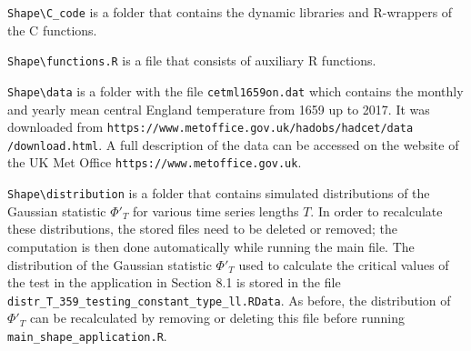 \documentclass[a4paper,12pt]{article}
\begin{document}
\verb|Shape\C_code| \hspace{1pt} is a folder that contains the dynamic libraries and R-wrappers of the C functions.

\verb|Shape\functions.R| \hspace{1pt} is a file that consists of auxiliary R functions.

\verb|Shape\data| \hspace{1pt} is a folder with the file \verb|cetml1659on.dat| which contains the monthly and yearly mean central England temperature from 1659 up to 2017. It was downloaded from \verb|https://www.metoffice.gov.uk/hadobs/hadcet/data| \verb|/download.html|. A full description of the data can be accessed on the website of the UK Met Office \verb|https://www.metoffice.gov.uk|. 

\verb|Shape\distribution| \hspace{1pt} is a folder that  contains simulated distributions of the Gaussian statistic $\Phi'_{T}$ for various time series lengths $T$. In order to recalculate these distributions, the stored files need to be deleted or removed; the computation is then done automatically while running the main file. The distribution of the Gaussian statistic $\Phi'_T$ used to calculate the critical values of the test in the application in Section 8.1 is stored in the file \verb|distr_T_359_testing_constant_type_ll.RData|. As before, the distribution of $\Phi'_T$ can be recalculated by removing or deleting this file before running \verb|main_shape_application.R|.  
\vspace{0.2cm}
\end{document}

